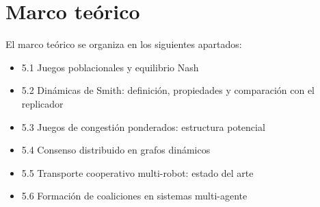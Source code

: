 ﻿%
\section{Marco teórico}
\label{sec:marco}

El marco teórico se organiza en los siguientes apartados:

\begin{itemize}
  \item 5.1 Juegos poblacionales y equilibrio Nash
  \item 5.2 Dinámicas de Smith: definición, propiedades y comparación con
    el replicador
  \item 5.3 Juegos de congestión ponderados: estructura potencial
  \item 5.4 Consenso distribuido en grafos dinámicos
  \item 5.5 Transporte cooperativo multi-robot: estado del arte
  \item 5.6 Formación de coaliciones en sistemas multi-agente
\end{itemize}
